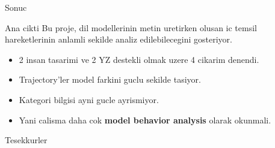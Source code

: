 \documentclass[aspectratio=169]{beamer}
\begin{document}
\begin{frame}{Sonuc}
  \begin{block}{Ana cikti}
    Bu proje, dil modellerinin metin uretirken olusan ic temsil hareketlerinin
    anlamli sekilde analiz edilebilecegini gosteriyor.
  \end{block}

  \vspace{0.5em}
  \begin{itemize}
    \item 2 insan tasarimi ve 2 YZ destekli olmak uzere 4 cikarim denendi.
    \item Trajectory'ler model farkini guclu sekilde tasiyor.
    \item Kategori bilgisi ayni gucle ayrismiyor.
    \item Yani calisma daha cok \textbf{model behavior analysis} olarak okunmali.
  \end{itemize}

  \vspace{0.8em}
  \centering
  {\Large Tesekkurler}
\end{frame}
\end{document}
